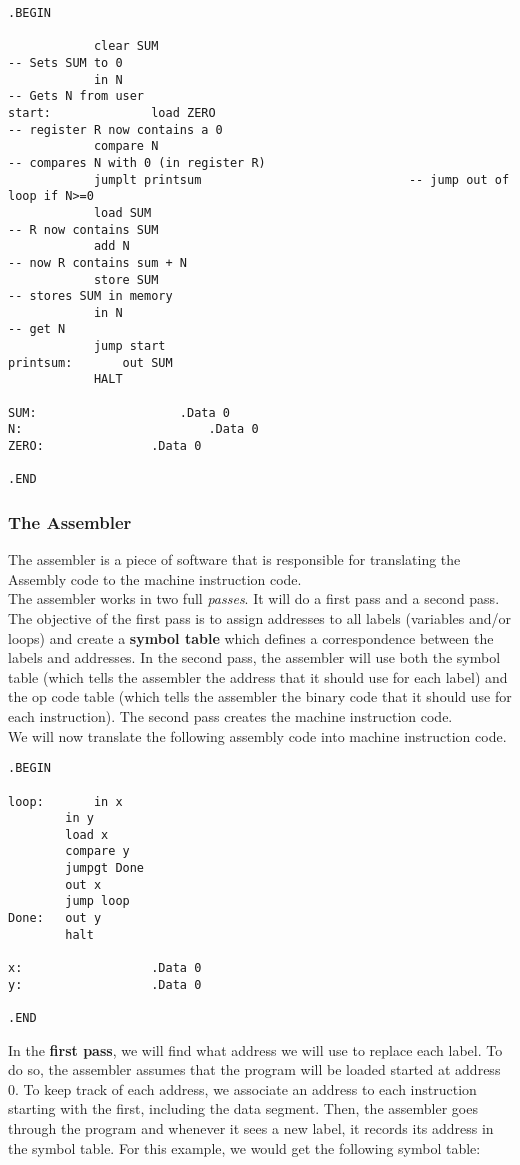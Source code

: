 \documentclass[]{article}
\begin{document}
\begin{lstlisting}[style=customasm]
.BEGIN

			clear SUM  													-- Sets SUM to 0
			in N																			-- Gets N from user
start: 				load ZERO														-- register R now contains a 0
			compare N														-- compares N with 0 (in register R)
			jumplt printsum								-- jump out of loop if N>=0
			load SUM															-- R now contains SUM
			add N																		-- now R contains sum + N
			store SUM														-- stores SUM in memory
			in N																			-- get N
			jump start
printsum:		out SUM
			HALT
	
SUM:					.Data 0
N:   						.Data 0
ZERO:				.Data 0

.END
\end{lstlisting}\bigbreak


\subsubsection{The Assembler}
\bigbreak

The assembler is a piece of software that is responsible for translating the Assembly code to the machine instruction code.\\

The assembler works in two full \textit{passes}. It will do a first pass and a second pass. The objective of the first pass is to assign addresses to all labels (variables and/or loops) and create a \textbf{symbol table} which defines a correspondence between the labels and addresses. In the second pass, the assembler will use both the symbol table (which tells the assembler the address that it should use for each label) and the op code table (which tells the assembler the binary code that it should use for each instruction). The second pass creates the machine instruction code.\\

We will now translate the following assembly code into machine instruction code.

\begin{lstlisting}[style=customasm]
.BEGIN
	
loop:		in x
		in y
		load x
		compare y
		jumpgt Done
		out x
		jump loop
Done: 	out y
		halt
	
x:					.Data 0
y:   				.Data 0
	
.END
\end{lstlisting}\bigbreak

In the \textbf{first pass}, we will find what address we will use to replace each label. To do so, the assembler assumes that the program will be loaded started at address 0. To keep track of each address, we associate an address to each instruction starting with the first, including the data segment. Then, the assembler goes through the program and whenever it sees a new label, it records its address in the symbol table. For this example, we would get the following symbol table:
\end{document}
